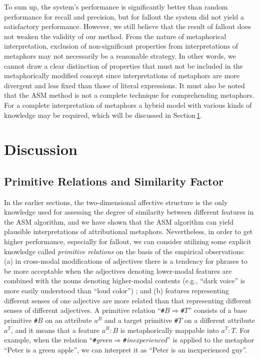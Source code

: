 To sum up, the \SNAME\/ system's performance is significantly better than random performance
for recall and precision, but for fallout the system did not yield a satisfactory performance.
However, we still believe that the result of fallout does not weaken the validity of our method.
From the nature of metaphorical interpretation, 
exclusion of non-significant properties from interpretations of metaphors may not 
necessarily be a reasonable strategy.
In other words, we cannot draw a clear distinction of properties 
that must not be included in the metaphorically modified concept
since interpretations of metaphors are more divergent and less fixed 
than those of literal expressions.
It must also be noted that the ASM method is not a complete 
technique for comprehending metaphors.
For a complete interpretation of metaphors a hybrid model with various kinds of
knowledge may be required, which will be discussed in Section\,\ref{sec:discussion}.

\section{Discussion} \label{sec:discussion}
\subsection{Primitive Relations and Similarity Factor} \label{subsec:factor}
In the earlier sections, 
the two-dimensional affective structure is the only knowledge used for 
assessing the degree of similarity between different features in the ASM algorithm,
and we have shown that the ASM algorithm can yield plausible interpretations of
attributional metaphors.
Nevertheless, in order to get higher performance, especially for fallout,
we can consider utilizing some explicit knowledge called {\it primitive relations\/}
on the basis of the empirical observations:
(a) in cross-modal modifications of adjectives 
there is a tendency for phrases to be more acceptable 
when the adjectives denoting lower-modal features are combined 
with the nouns denoting higher-modal contents 
(e.g., ``dark voice'' is more easily understood than ``loud color'')
\cite{Kusumi88}; and 
(b) features representing different senses of one adjective
are more related than that representing different senses of 
different adjectives.
A primitive relation ``{\tt\#}$B$$\Rightarrow${\tt\#}$T$''
consists of a base primitive {\tt\#}$B$ on an attribute $a^B$
and a target primitive {\tt\#}$T$ on a different attribute $a^T$,
and it means that a feature $a^B\!:\!B$ is metaphorically mappable into
$a^T\!:\!T$.
For example, when the relation ``{\tt\#}{\it green\/}$\Rightarrow${\tt\#}{\it inexperienced\/}''
is applied to the metaphor ``Peter is a green apple'',
we can interpret it as ``Peter is an inexperienced guy''.


